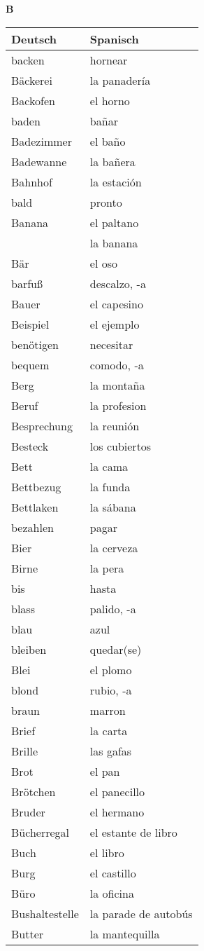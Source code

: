 \begin{flushright}\begin{Huge}\textbf{B}\end{Huge}\end{flushright}

\begin{longtable}{p{} p{}} 
\textbf{Deutsch}     & \textbf{Spanisch}                                       \\ \hline
\hline
\endhead %
backen & hornear\\
Bäckerei & la panadería\\
Backofen & el horno\\
baden & bañar\\
Badezimmer & el baño\\
Badewanne & la bañera\\
Bahnhof & la estación \\
bald & pronto\\
Banana & el paltano\\
~ & la banana\\
Bär & el oso\\
barfuß & descalzo, -a\\
Bauer & el capesino \\
Beispiel & el ejemplo \\
benötigen & necesitar\\
bequem & comodo, -a\\
Berg & la montaña \\
Beruf & la profesion\\
Besprechung & la reunión\\
Besteck & los cubiertos\\
Bett & la cama \\
Bettbezug & la funda\\
Bettlaken & la sábana\\
bezahlen & pagar\\
Bier & la cerveza\\
Birne & la pera\\
bis & hasta \\
blass & palido, -a\\
blau & azul \\
bleiben & quedar(se)\\
Blei & el plomo \\
blond & rubio, -a\\
braun & marron \\
Brief & la carta\\
Brille & las gafas\\
Brot & el pan\\
Brötchen & el panecillo\\
Bruder & el hermano\\
Bücherregal & el estante de libro\\
Buch & el libro \\
Burg & el castillo\\
Büro & la oficina\\
Bushaltestelle & la parade de autobús\\
Butter & la mantequilla \\
\end{longtable}
